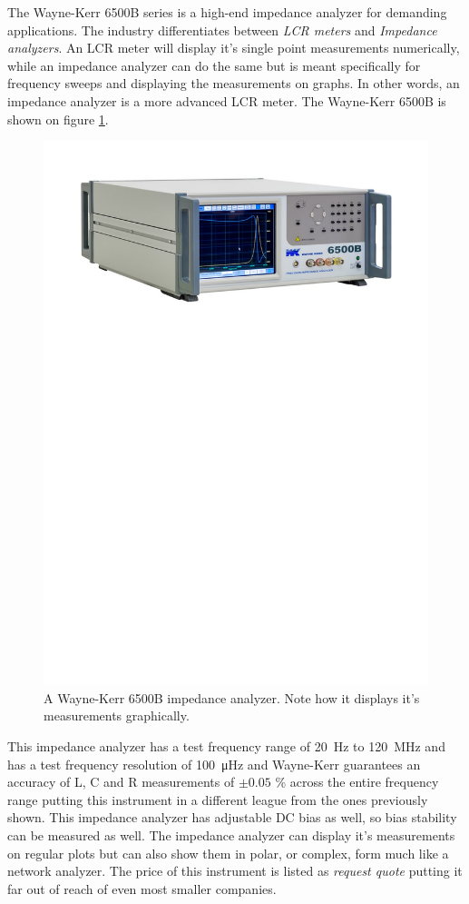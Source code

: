 The Wayne-Kerr 6500B\cite{WayneKerr6500} series is a high-end impedance analyzer for demanding applications. The industry differentiates between \textit{LCR meters} and \textit{Impedance analyzers}. An LCR meter will display it's single point measurements numerically, while an impedance analyzer can do the same but is meant specifically for frequency sweeps and displaying the measurements on graphs. In other words, an impedance analyzer is a more advanced LCR meter. The Wayne-Kerr 6500B is shown on figure \ref{fig:2_2_WayneKerr6500B}. 
\begin{figure}[H]
    \centering
    \includegraphics[clip, trim=0 550 0 50, width=1\textwidth]{Sections/2_ProblemAnalysis/FIgures/WayneKerrImpedanceAnalyzer.pdf}
    \caption{A Wayne-Kerr 6500B impedance analyzer. Note how it displays it's measurements graphically.}
    \label{fig:2_2_WayneKerr6500B}
\end{figure}
This impedance analyzer has a test frequency range of \SI[]{20}{\hertz} to \SI[]{120}{\mega\hertz} and has a test frequency resolution of \SI[]{100}{\micro\hertz} and Wayne-Kerr guarantees an accuracy of L, C and R measurements of $\pm 0.05$ \% across the entire frequency range putting this instrument in a different league from the ones previously shown. This impedance analyzer has adjustable DC bias as well, so bias stability can be measured as well. The impedance analyzer can display it's measurements on regular plots but can also show them in polar, or complex, form much like a network analyzer. The price of this instrument is listed as \textit{request quote} putting it far out of reach of even most smaller companies.


